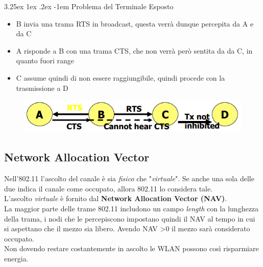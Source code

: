 \documentclass{article}
\makeatletter
\renewcommand\paragraph{\@startsection{paragraph}{5}{\z@}%
  {3.25ex \@plus1ex \@minus.2ex}%
  {-1em}%
  {\normalfont\normalsize\bfseries}}
\makeatother
\begin{document}
                    \paragraph{Problema del Terminale Esposto}
                        \begin{itemize}
                            \item B invia una trama RTS in broadcast, questa verrà dunque percepita da A e da C
                            \item A risponde a B con una trama CTS, che non verrà però sentita da da C, in quanto fuori range
                            \item C assume quindi di non essere raggiungibile, quindi procede con la trasmissione a D
                        \end{itemize}
                        \begin{figure}[H]
                            \centering
                            \includegraphics[width=\textwidth]{pic/esposto_cts_rst.png}
                            \label{Soluzione al Terminale Esposto con RTS/CTS}
                        \end{figure}

        \subsection{Network Allocation Vector}
            Nell'802.11 l'ascolto del canale è sia \textit{fisico} che "\textit{virtuale}". Se anche una sola delle due indica il canale come occupato, allora 802.11 lo considera tale.\\
            L'ascolto \textit{virtuale} è fornito dal \textbf{Network Allocation Vector (NAV)}.\\
            La maggior parte delle trame 802.11 includono un campo \textit{length} con la lunghezza della trama, i nodi che le percepiscono impostano quindi il NAV al tempo in cui si aspettano che il mezzo sia libero. Avendo NAV >0 il mezzo sarà considerato occupato.\\
            Non dovendo restare costantemente in ascolto le WLAN possono così risparmiare energia.
\end{document}
